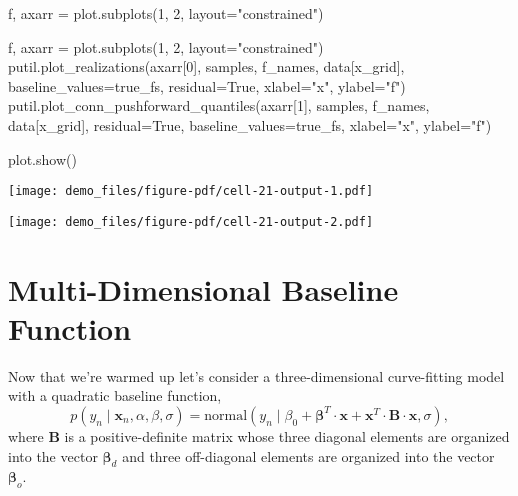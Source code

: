 \documentclass[
  letterpaper,
  DIV=11,
  numbers=noendperiod]{scrartcl}
\newenvironment{Shaded}{\begin{snugshade}}{\end{snugshade}}
\newcommand{\DecValTok}[1]{\textcolor[rgb]{0.68,0.00,0.00}{#1}}
\newcommand{\NormalTok}[1]{\textcolor[rgb]{0.00,0.23,0.31}{#1}}
\newcommand{\OperatorTok}[1]{\textcolor[rgb]{0.37,0.37,0.37}{#1}}
\newcommand{\StringTok}[1]{\textcolor[rgb]{0.13,0.47,0.30}{#1}}
\newcommand{\VariableTok}[1]{\textcolor[rgb]{0.07,0.07,0.07}{#1}}
\begin{document}
\begin{Shaded}
\begin{Highlighting}[]
\NormalTok{f, axarr }\OperatorTok{=}\NormalTok{ plot.subplots(}\DecValTok{1}\NormalTok{, }\DecValTok{2}\NormalTok{, layout}\OperatorTok{=}\StringTok{"constrained"}\NormalTok{)}

\NormalTok{f, axarr }\OperatorTok{=}\NormalTok{ plot.subplots(}\DecValTok{1}\NormalTok{, }\DecValTok{2}\NormalTok{, layout}\OperatorTok{=}\StringTok{"constrained"}\NormalTok{)}
\NormalTok{putil.plot\_realizations(axarr[}\DecValTok{0}\NormalTok{], samples,}
\NormalTok{                        f\_names, data[}\StringTok{\textquotesingle{}x\_grid\textquotesingle{}}\NormalTok{],}
\NormalTok{                        baseline\_values}\OperatorTok{=}\NormalTok{true\_fs,}
\NormalTok{                        residual}\OperatorTok{=}\VariableTok{True}\NormalTok{,}
\NormalTok{                        xlabel}\OperatorTok{=}\StringTok{"x"}\NormalTok{, ylabel}\OperatorTok{=}\StringTok{"f"}\NormalTok{)}
\NormalTok{putil.plot\_conn\_pushforward\_quantiles(axarr[}\DecValTok{1}\NormalTok{], samples,}
\NormalTok{                                      f\_names, data[}\StringTok{\textquotesingle{}x\_grid\textquotesingle{}}\NormalTok{],}
\NormalTok{                                      residual}\OperatorTok{=}\VariableTok{True}\NormalTok{,}
\NormalTok{                                      baseline\_values}\OperatorTok{=}\NormalTok{true\_fs,}
\NormalTok{                                      xlabel}\OperatorTok{=}\StringTok{"x"}\NormalTok{, ylabel}\OperatorTok{=}\StringTok{"f"}\NormalTok{)}

\NormalTok{plot.show()}
\end{Highlighting}
\end{Shaded}

\texttt{[image: demo\_files/figure-pdf/cell-21-output-1.pdf]}

\texttt{[image: demo\_files/figure-pdf/cell-21-output-2.pdf]}

\section{Multi-Dimensional Baseline
Function}\label{multi-dimensional-baseline-function}

Now that we're warmed up let's consider a three-dimensional
curve-fitting model with a quadratic baseline function, \[
p(y_{n} \mid \mathbf{x}_{n}, \alpha, \beta, \sigma)
=
\text{normal}(y_{n}   \mid \beta_{0}
                    + \boldsymbol{\beta}^{T} \cdot \mathbf{x}
                    + \mathbf{x}^{T} \cdot \mathbf{B} \cdot \mathbf{x}, \sigma),
\] where \(\mathbf{B}\) is a positive-definite matrix whose three
diagonal elements are organized into the vector
\(\boldsymbol{\beta}_{d}\) and three off-diagonal elements are organized
into the vector \(\boldsymbol{\beta}_{o}\).
\end{document}
